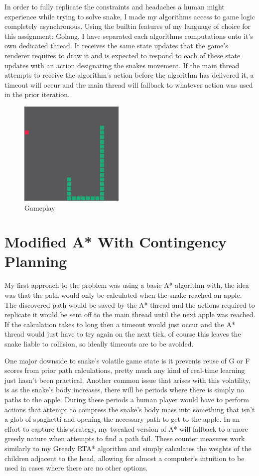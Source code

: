 \documentclass[letterpaper]{article} %
\begin{document}
In order to fully replicate the constraints and headaches a human might experience while trying to solve snake, I made my algorithms access to game logic completely asynchronous. Using the builtin features of my language of choice for this assignment: Golang, I have separated each algorithms computations onto it's own dedicated thread. It receives the same state updates that the game's renderer requires to draw it and is expected to respond to each of these state updates with an action designating the snakes movement. If the main thread attempts to receive the algorithm's action before the algorithm has delivered it, a timeout will occur and the main thread will fallback to whatever action was used in the prior iteration.

\begin{figure}[h]
  \centering
  \includegraphics[height=5cm]{../screenshots/game}
  \caption{Gameplay}
  \label{fig:gameplay}
\end{figure}

\section{Modified A* With Contingency Planning}
My first approach to the problem was using a basic A* algorithm with, the idea was that the path would only be calculated when the snake reached an apple. The discovered path would be saved by the A* thread and the actions required to replicate it would be sent off to the main thread until the next apple was reached. If the calculation takes to long then a timeout would just occur and the A* thread would just have to try again on the next tick, of course this leaves the snake liable to collision, so ideally timeouts are to be avoided.

One major downside to snake's volatile game state is it prevents reuse of G or F scores from prior path calculations, pretty much any kind of real-time learning just hasn't been practical. Another common issue that arises with this volatility, is as the snake's body increases, there will be periods where there is simply no paths to the apple. During these periods a human player would have to perform actions that attempt to compress the snake's body mass into something that isn't a glob of spaghetti and opening the necessary path to get to the apple. In an effort to capture this strategy, my tweaked version of A* will fallback to a more greedy nature when attempts to find a path fail. These counter measures work similarly to my Greedy RTA* algorithm and simply calculates the weights of the children adjacent to the head, allowing for almost a computer's intuition to be used in cases where there are no other options.
\end{document}
